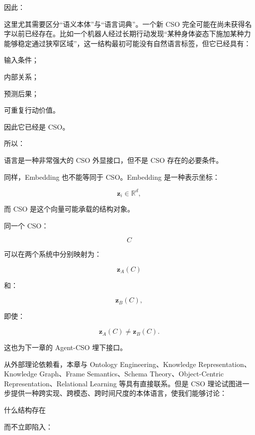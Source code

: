 因此：

\begin{statementbox}
\centering
{}
\end{statementbox}

这里尤其需要区分“语义本体”与“语言词典”。一个新 CSO 完全可能在尚未获得名字以前已经存在。比如一个机器人经过长期行动发现“某种身体姿态下施加某种力能够稳定通过狭窄区域”，这一结构最初可能没有自然语言标签，但它已经具有：

输入条件；

内部关系；

预测后果；

可重复行动价值。

因此它已经是 CSO。

所以：

\begin{statementbox}
\centering
{}
\end{statementbox}

语言是一种非常强大的 CSO 外显接口，但不是 CSO 存在的必要条件。

同样，Embedding 也不能等同于 CSO。Embedding 是一种表示坐标：

\[
\mathbf z_i\in\mathbb R^d,
\]

而 CSO 是这个向量可能承载的结构对象。

同一个 CSO：

\[
C
\]

可以在两个系统中分别映射为：

\[
\mathbf z_A(C)
\]

和：

\[
\mathbf z_B(C),
\]

即使：

\[
\mathbf z_A(C)
\neq
\mathbf z_B(C).
\]

这也为下一章的 Agent-CSO 埋下接口。

从外部理论依赖看，本章与 Ontology Engineering、Knowledge Representation、Knowledge Graph、Frame Semantics、Schema Theory、Object-Centric Representation、Relational Learning 等具有直接联系。但是 CSO 理论试图进一步提供一种跨实现、跨模态、跨时间尺度的本体语言，使我们能够讨论：

\begin{statementbox}
什么结构存在
\end{statementbox}

而不立即陷入：


